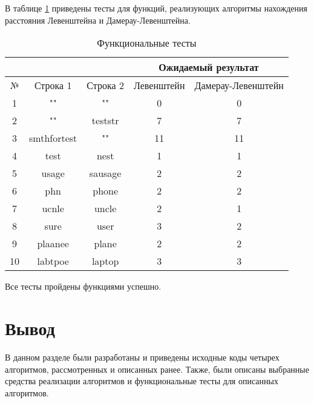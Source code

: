 В таблице \ref{tbl:functional_test} приведены тесты для функций, реализующих алгоритмы нахождения расстояния Левенштейна и Дамерау-Левенштейна.
\begin{table}[h]
	\begin{center}
		\begin{threeparttable}
			\captionsetup{justification=raggedright,singlelinecheck=off}
			\caption{\label{tbl:functional_test} Функциональные тесты}
			\begin{tabular}{|c|c|c|c|c|}
				\hline
				& & & \multicolumn{2}{c|}{Ожидаемый результат} \\
				\hline
				№&Строка 1&Строка 2&Левенштейн&Дамерау-Левенштейн \\
				\hline
				1&""&""&0&0 \\
				\hline
				2&""&teststr&7&7 \\
				\hline
				3&smthfortest&""&11&11 \\
				\hline
				4&test&nest&1&1\\
				\hline
				5&usage&sausage&2&2\\
				\hline
				6&phn&phone&2&2\\
				\hline
				7&ucnle&uncle&2&1\\
				\hline
				8&sure&user&3&2\\
				\hline
				9&plaanee&plane&2&2\\
				\hline
				10&labtpoe&laptop&3&3\\
				\hline
			\end{tabular}
		\end{threeparttable}
	\end{center}
\end{table}
\newline
Все тесты пройдены функциями успешно.
\section*{Вывод}
В данном разделе были разработаны и приведены исходные коды четырех алгоритмов, рассмотренных и описанных ранее. Также, были описаны выбранные средства реализации алгоритмов и функциональные тесты для описанных алгоритмов.
